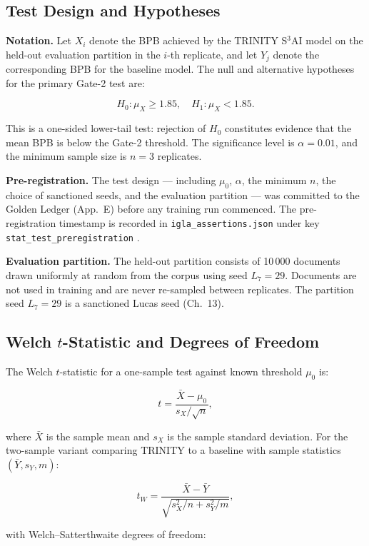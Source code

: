 \subsection{Test Design and Hypotheses}
\label{subsec:ch19-test-design}

\textbf{Notation.} Let \(X_i\) denote the BPB
achieved by the TRINITY S\(^3\)AI model on the held-out
evaluation partition in the \(i\)-th replicate,
and let \(Y_j\) denote the corresponding BPB for
the baseline model. The null and alternative
hypotheses for the primary Gate-2 test are:

\[H_0: \mu_X \geq 1.85, \quad H_1: \mu_X < 1.85.\]

This is a one-sided lower-tail test: rejection of
\(H_0\) constitutes evidence that the mean BPB is
below the Gate-2 threshold. The significance level
is \(\alpha = 0.01\), and the minimum sample size
is \(n = 3\) replicates.

\textbf{Pre-registration.} The test design ---
including \(\mu_0\), \(\alpha\), the minimum
\(n\), the choice of sanctioned seeds, and the
evaluation partition --- was committed to the
Golden Ledger (App.~E) before any training run
commenced. The pre-registration timestamp is
recorded in \texttt{igla\_assertions.json} under
key \texttt{stat\_test\_preregistration} \cite{t27spec}.

\textbf{Evaluation partition.} The held-out
partition consists of 10\,000 documents drawn
uniformly at random from the corpus using seed
\(L_7 = 29\). Documents are not used in training
and are never re-sampled between replicates. The
partition seed \(L_7 = 29\) is a sanctioned Lucas
seed (Ch.~13).

\subsection{Welch \(t\)-Statistic and Degrees of Freedom}
\label{subsec:ch19-welch-stat}

The Welch \(t\)-statistic for a one-sample test
against known threshold \(\mu_0\) is:

\[t = \frac{\bar{X} - \mu_0}{s_X / \sqrt{n}},\]

where \(\bar{X}\) is the sample mean and \(s_X\)
is the sample standard deviation. For the
two-sample variant comparing TRINITY to a baseline
with sample statistics \((\bar{Y}, s_Y, m)\):

\[t_W = \frac{\bar{X} - \bar{Y}}{\sqrt{s_X^2/n + s_Y^2/m}},\]

with Welch--Satterthwaite degrees of freedom:

